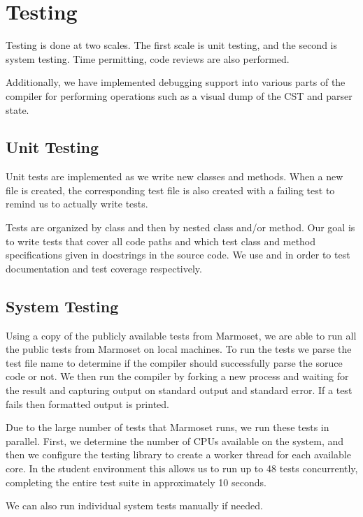 \documentclass[pdftex,11pt,a4paper]{article}
\begin{document}
\section{Testing}

Testing is done at two scales. The first scale is unit testing, and
the second is system testing. Time permitting, code reviews are also
performed.

Additionally, we have implemented debugging support into various parts
of the compiler for performing operations such as a visual dump of the
CST and parser state.


\subsection{Unit Testing}

Unit tests are implemented as we write new classes and
methods. When a new file is created, the corresponding test file is
also created with a failing test to remind us to actually write tests.

Tests are organized by class and then by nested class and/or
method. Our goal is to write tests that cover all code paths and which
test class and method specifications given in docstrings in the source
code. We use  and  in order to test
documentation and test coverage respectively.


\subsection{System Testing}

Using a copy of the publicly available tests from Marmoset, we are
able to run all the public tests from Marmoset on local machines. To
run the tests we parse the test file name to determine if the compiler
should successfully parse the soruce code or not. We then run the
compiler by forking a new process and waiting for the result and
capturing output on standard output and standard error. If a test
fails then formatted output is printed.

Due to the large number of tests that Marmoset runs, we run these
tests in parallel. First, we determine the number of CPUs available on
the system, and then we configure the testing library to create a
worker thread for each available core. In the student environment this
allows us to run up to 48 tests concurrently, completing the entire
test suite in approximately 10 seconds.

We can also run individual system tests manually if needed.
\end{document}

